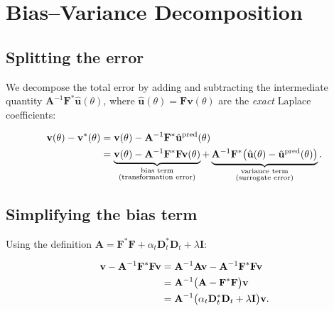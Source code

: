 \documentclass[11pt, a4paper]{article}
\begin{document}
\section{Bias--Variance Decomposition}

\subsection{Splitting the error}

We decompose the total error by adding and subtracting the intermediate
quantity $\mathbf{A}^{-1}\mathbf{F}^*\hat{\mathbf{u}}(\theta)$,
where $\hat{\mathbf{u}}(\theta) = \mathbf{F}\mathbf{v}(\theta)$ are the
\emph{exact} Laplace coefficients:

\begin{align}
  \mathbf{v}(\theta) - \mathbf{v}^*(\theta)
  &= \mathbf{v}(\theta)
     - \mathbf{A}^{-1}\mathbf{F}^*\hat{\mathbf{u}}^{\mathrm{pred}}(\theta)
     \notag \\
  &= \underbrace{
       \mathbf{v}(\theta) - \mathbf{A}^{-1}\mathbf{F}^*\mathbf{F}\mathbf{v}(\theta)
     }_{\substack{\text{bias term} \\ \text{(transformation error)}}}
   + \underbrace{
       \mathbf{A}^{-1}\mathbf{F}^*
       \bigl(\hat{\mathbf{u}}(\theta) - \hat{\mathbf{u}}^{\mathrm{pred}}(\theta)\bigr)
     }_{\substack{\text{variance term} \\ \text{(surrogate error)}}}.
  \label{eq:decomp}
\end{align}

\subsection{Simplifying the bias term}

Using the definition $\mathbf{A} = \mathbf{F}^*\mathbf{F}
+ \alpha_t\mathbf{D}_t^*\mathbf{D}_t + \lambda\mathbf{I}$:

\begin{align}
  \mathbf{v} - \mathbf{A}^{-1}\mathbf{F}^*\mathbf{F}\mathbf{v}
  &= \mathbf{A}^{-1}\mathbf{A}\mathbf{v}
     - \mathbf{A}^{-1}\mathbf{F}^*\mathbf{F}\mathbf{v}
     \notag \\
  &= \mathbf{A}^{-1}
     \bigl(\mathbf{A} - \mathbf{F}^*\mathbf{F}\bigr)\mathbf{v}
     \notag \\
  &= \mathbf{A}^{-1}
     \bigl(\alpha_t\mathbf{D}_t^*\mathbf{D}_t + \lambda\mathbf{I}\bigr)
     \mathbf{v}.
  \label{eq:bias_simplified}
\end{align}
\end{document}

